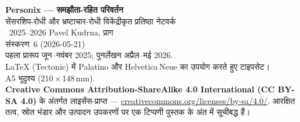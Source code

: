 \thispagestyle{empty}
\ifdefined\printmode\vspace*{\fill}\else{}\fi
\begin{flushleft}\small\sffamily
\textbf{Personix --- समझौता-रहित परिवर्तन}\\[0.3em]
सेंसरशिप-रोधी और भ्रष्टाचार-रोधी विकेंद्रीकृत प्रतिष्ठा नेटवर्क\\[1.4em]

\textcopyright\ 2025--2026 Pavel Kudrna, प्राग\\[0.4em]

संस्करण~6 (2026-05-21)\\
पहला प्रारूप जून--नवंबर 2025; पुनर्लेखन अप्रैल--मई 2026.\\[1.4em]

\LaTeX{} (Tectonic) में Palatino और Helvetica\,Neue का उपयोग करते हुए टाइपसेट।\\
A5 भूदृश्य (210\,$\times$\,148\,mm).\\[1.4em]

\textbf{Creative Commons Attribution-ShareAlike 4.0
International (CC BY-SA 4.0)} के अंतर्गत लाइसेंस-प्राप्त ---
\href{https://creativecommons.org/licenses/by-sa/4.0/}{creativecommons.org/licenses/by-sa/4.0/}.
आरक्षित तत्व, स्रोत भंडार और उत्पादन उपकरणों पर एक टिप्पणी
पुस्तक के अंत में सूचीबद्ध हैं।
\end{flushleft}
\ifdefined\printmode\else{}\fi
\clearpage
